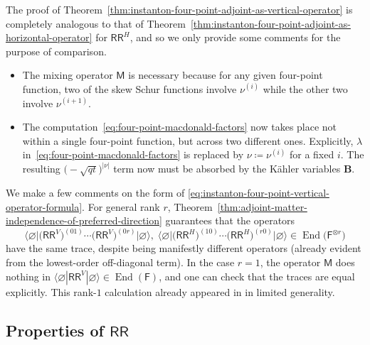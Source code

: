 \documentclass[10pt,a4paper]{amsart}
\numberwithin{equation}{section}
\renewcommand{\vec}[1]{\bm{#1}}
\newcommand{\sF}{\mathsf{F}}
\newcommand{\sM}{\mathsf{M}}
\newcommand{\sRR}{\mathsf{RR}}
\DeclareMathOperator{\End}{End}
\begin{document}
\begin{MyParagraph}
The proof of
Theorem~\ref{thm:instanton-four-point-adjoint-as-vertical-operator} is
completely analogous to that of
Theorem~\ref{thm:instanton-four-point-adjoint-as-horizontal-operator}
for $\sRR^H$, and so we only provide some comments for the purpose of
comparison.
\begin{itemize}\itemsep=0pt
\item The mixing operator $\sM$ is necessary because for any given
 four-point function, two of the skew Schur functions involve
 $\nu^{(i)}$ while the other two involve $\nu^{(i+1)}$.
\item The computation~\eqref{eq:four-point-macdonald-factors} now
 takes place not within a single four-point function, but across two
 different ones. Explicitly, $\lambda$ in~\eqref{eq:four-point-macdonald-factors} is replaced by $\nu
 \coloneqq \nu^{(i)}$ for a fixed $i$. The resulting
 $\big({-}\sqrt{qt}\big)^{|\nu|}$ term now must be absorbed by the K\"ahler
 variables $\vec B$.
\end{itemize}
\end{MyParagraph}

\begin{MyParagraph}
We make a few comments on the form of
\eqref{eq:instanton-four-point-vertical-operator-formula}. For general
rank $r$,
Theorem~\ref{thm:adjoint-matter-independence-of-preferred-direction}
guarantees that the operators
\[ \big\langle \varnothing \big| \big(\sRR^V\big)^{(01)} \cdots \big(\sRR^V\big)^{(0r)} \big| \varnothing\big\rangle, \; \big\langle\varnothing \big| \big(\sRR^H\big)^{(10)} \cdots \big(\sRR^H\big)^{(r0)} | \varnothing\big\rangle \in \End\big(\sF^{\otimes r}\big) \]
have the same trace, despite being manifestly different operators
(already evident from the lowest-order off-diagonal term). In the case
$r = 1$, the operator $\sM$ does nothing in
$\big\langle\varnothing | \sRR^V | \varnothing\big\rangle \in \End(\sF)$, and one can
check that the traces are equal explicitly. This rank-$1$ calculation
already appeared in \cite[Section~5]{Iqbal2010} in limited generality.
\end{MyParagraph}

\subsection[Properties of RR]{Properties of $\boldsymbol{\sRR}$}
\label{sec:properties-of-RR}
\end{document}
